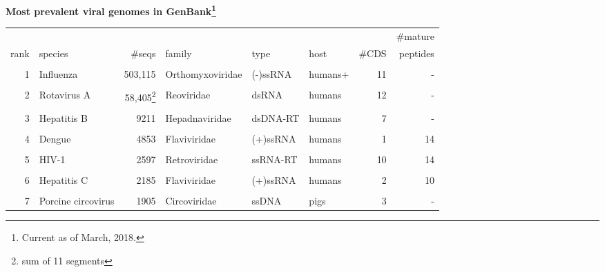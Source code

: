 \documentclass[landscape]{slides}
\begin{document}
\begin{slide}
\begin{center}

\textbf{Most prevalent viral genomes in GenBank\footnote{Current as of March, 2018.}}

\tiny
\begin{tabular}{r|l|r|l|l|l|r|r}
     &                     &              &                &          &        &       & \#mature \\ 
rank & species             & \#seqs       & family         & type     & host   &  \#CDS& peptides \\ \hline
     &                     &              &                &          &        &       &          \\ 
  1  &  Influenza          &   503,115    & Orthomyxoviridae& (-)ssRNA& humans+&    11 & -        \\ %
     &                     &              &                &          &        &       &          \\ 
  2  & Rotavirus A         &58,405\footnote{sum of 11 segments}& Reoviridae&dsRNA&humans&   12 & -\\ %
     &                     &              &                &          &        &       &          \\ 
  3  & Hepatitis B         &         9211 & Hepadnaviridae & dsDNA-RT & humans &     7 & -        \\ %
     &                     &              &                &          &        &       &          \\ 
  4  & Dengue              &         4853 & Flaviviridae   & (+)ssRNA & humans &     1 & 14       \\ %
     &                     &              &                &          &        &       &          \\ 
  5  & HIV-1               &        2597  & Retroviridae   & ssRNA-RT & humans &    10 & 14       \\ %
     &                     &              &                &          &        &       &          \\ 
  6  & Hepatitis C         &        2185  & Flaviviridae   & (+)ssRNA & humans &     2 & 10       \\ %
     &                     &              &                &          &        &       &          \\ 
  7  & Porcine circovirus  &        1905  & Circoviridae   & ssDNA    & pigs   &     3 & -        \\ %

\end{tabular}
\end{center}
\end{slide}
\end{document}
